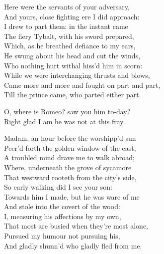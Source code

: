 \begin{speech}
Here were the servants of your adversary, \\
And yours, close fighting ere I did approach: \\
I drew to part them: in the instant came \\
The fiery Tybalt, with his sword prepared, \\
Which, as he breathed defiance to my ears, \\
He swung about his head and cut the winds, \\
Who nothing hurt withal hiss'd him in scorn: \\
While we were interchanging thrusts and blows, \\
Came more and more and fought on part and part, \\
Till the prince came, who parted either part. \\
\end{speech}
\begin{speech}
 O, where is Romeo? saw you him to-day? \\
Right glad I am he was not at this fray. \\
\end{speech}
\begin{speech}
Madam, an hour before the worshipp'd sun \\
Peer'd forth the golden window of the east, \\
A troubled mind drave me to walk abroad; \\
Where, underneath the grove of sycamore \\
That westward rooteth from the city's side, \\
So early walking did I see your son: \\
Towards him I made, but he was ware of me \\
And stole into the covert of the wood: \\
I, measuring his affections by my own, \\
That most are busied when they're most alone, \\
Pursued my humour not pursuing his, \\
And gladly shunn'd who gladly fled from me. \\
\end{speech}
